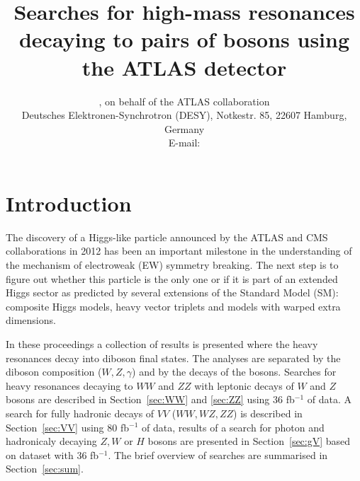 \documentclass{PoS}
\title{Searches for high-mass resonances decaying to pairs of bosons using the ATLAS detector}
\author{\speaker{Kirill Grevtsov}, {on behalf of the ATLAS collaboration}\\%
        Deutsches Elektronen-Synchrotron (DESY), Notkestr. 85, 22607 Hamburg, Germany\\
        E-mail: \email{kirill.grevtsov@cern.ch}}
\begin{document}
\linenumbers


\section{Introduction}

The discovery of a Higgs-like particle announced by the ATLAS and CMS collaborations in 2012 \cite{HIGG-2012-27,CMS-HIG-12-028} has been an important milestone in the understanding of the mechanism of electroweak (EW) symmetry breaking. %
The next step is to figure out whether this particle is the only one or if it is part of an extended Higgs sector as predicted by several extensions of the Standard Model (SM): composite Higgs models, heavy vector triplets and models with warped extra dimensions.


In these proceedings a collection of results is presented where the heavy resonances decay into diboson final states. 
The analyses are separated by the diboson composition ($W,Z, \gamma$) and by the decays of the bosons. 
Searches for heavy resonances decaying to $WW$ and $ZZ$ with leptonic decays of $W$ and $Z$ bosons are described in Section~\ref{sec:WW} and \ref{sec:ZZ} using 36 fb$^{-1}$ of data.
A search for fully hadronic decays of $VV$ ($WW, WZ, ZZ$) is described in Section~\ref{sec:VV} using 80 fb$^{-1}$ of data, results of a search for photon and hadronicaly decaying $Z,W$ or $H$ bosons are presented in Section~\ref{sec:gV} based on dataset with 36 fb$^{-1}$. The brief overview of searches are summarised in Section~\ref{sec:sum}.

\end{document}
